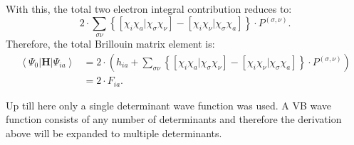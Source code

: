 With this, the total two electron integral contribution reduces to:
\begin{equation}
2 \cdot \sum_{\sigma\nu} \left\{ [\chi_i\chi_a|\chi_\sigma\chi_\nu] - [\chi_i\chi_\nu|\chi_\sigma\chi_a] \right\} \cdot P^{(\sigma,\nu)}.
\label{ch2.eq.twoel_ia_tot}
\end{equation}
Therefore, the total Brillouin matrix element is:
\begin{equation}
\begin{split}
\left < \Psi_0 | \mathbf{H} | \Psi_{ia} \right > & = 2 \cdot ( h_{ia} + \sum_{\sigma\nu} \left\{ [\chi_i\chi_a|\chi_\sigma\chi_\nu] - [\chi_i\chi_\nu|\chi_\sigma\chi_a] \right\} \cdot P^{(\sigma,\nu)}) \\
& = 2 \cdot F_{ia}.
\end{split}
\label{ch2.eq.brilisfock}
\end{equation}

Up till here only a single determinant wave function was used. A VB wave function consists of any number of determinants and therefore the derivation above will be expanded to multiple determinants.

